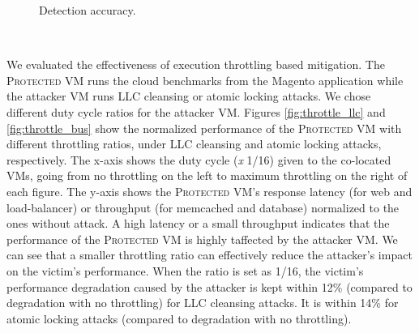 \documentclass{sig-alternate}
\newcommand{\bheading}[1]{{\vspace{2pt}\noindent{\textbf{#1}}\hspace{2pt}}}
\newcommand{\attackname}{memory DoS attacks\xspace}
\newcommand{\protectedVM}{\textsc{Protected VM}\xspace}
\begin{document}
\begin{figure}[ht]
     \centering
    \caption{Detection accuracy.}
    \label{fig:detect_accuracy}
\end{figure}

\begin{figure*}[t]
     \centering
      \hspace*{1.5em}
      \\
    \caption{Normalized performance of the \protectedVM with throttling of \attackname.}
    \label{fig:throttle}
\end{figure*}

\bheading{Effectiveness of mitigation.}
We evaluated the effectiveness of execution throttling
based mitigation. The \protectedVM runs the cloud benchmarks from the Magento 
application while the attacker VM runs LLC cleansing or atomic locking attacks. We 
chose different duty cycle ratios for the attacker VM. Figures 
\ref{fig:throttle_llc} and \ref{fig:throttle_bus} show the normalized
performance of the \protectedVM with different throttling ratios, under LLC 
cleansing and atomic locking attacks, respectively. The x-axis shows the duty 
cycle (\emph{x}  1/16) given to the co-located VMs, going from no 
throttling on the left to maximum throttling on the right of each figure. The 
y-axis shows the \protectedVM's response latency (for web and load-balancer) or throughput 
(for memcached and database) normalized to the ones without attack. A high latency or a 
small throughput indicates that the performance of the \protectedVM is highly 
taffected by the attacker VM. We can see that a 
smaller throttling ratio can effectively reduce the attacker's impact on the 
victim's performance. When the ratio is set as 1/16, the victim's performance degradation 
caused by the attacker is kept within 12\% (compared to  
degradation with no throttling) for LLC cleansing attacks. It is within 14\% for 
atomic locking attacks (compared to  degradation with no throttling).
\end{document}
